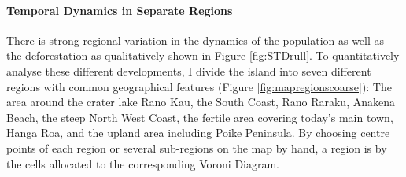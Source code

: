 \paragraph{Temporal Dynamics in Separate Regions}
There is strong regional variation in the dynamics of the population as well as the deforestation as qualitatively shown in Figure \ref{fig:STDrull}. 
To quantitatively analyse these different developments, I divide the island into seven different regions with common geographical features (Figure \ref{fig:mapregionscoarse}): The area around the crater lake Rano Kau, the South Coast, Rano Raraku, Anakena Beach, the steep North West Coast, the fertile area covering today's main town, Hanga Roa, and the upland area including Poike Peninsula. 
By choosing centre points of each region or several sub-regions on the map by hand, a region is  by the cells allocated to the corresponding Voroni Diagram.

